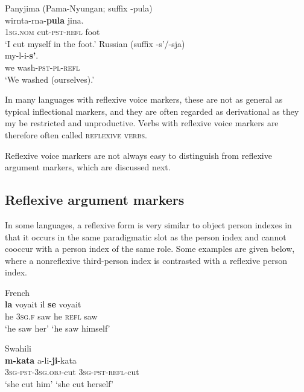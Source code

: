 \documentclass[output=paper]{langscibook}
\begin{document}
\ea  \label{ex:Haspelmath:17}
    \ea Panyjima (Pama-Nyungan; suffix -{pula}) \label{ex:Haspelmath:17a}\\
      {wirnta-rna-}\textbf{{pula}}  {jina.}\\
     \textsc{1sg.nom}  cut-\textsc{pst-refl}  foot \\
    \glt ‘I cut myself in the foot.’ \citep[160]{Dench1991}
    \ex Russian (suffix {{}-s’/-sja}) \label{ex:Haspelmath:17b}\\
      {my-l-i-}\textbf{{s’}}.\\
      we  wash-\textsc{pst-pl-refl}\\
      \glt ‘We washed (ourselves).’
    \z
\z   

    

In many languages with reflexive voice markers, these are not as general as typical inflectional markers, and they are often regarded as derivational as they my be restricted and unproductive. Verbs with reflexive voice markers are therefore often called \textsc{reflexive} \textsc{verbs}.

Reflexive voice markers are not always easy to distinguish from reflexive argument markers, which are discussed next.


\subsection{Reflexive argument markers}\label{sec:Haspelmath:5.3}

In some languages, a reflexive form is very similar to object person indexes in that it occurs in the same paradigmatic slot as the person index and cannot cooccur with a person index of the same role. Some examples are given below, where a nonreflexive third-person index is contrasted with a reflexive person index.

\ea French 
    \label{ex:Haspelmath:18}\\
      \textbf{{la}}  {voyait}      {il}  \textbf{{se}}  {voyait}\\
      he  \textsc{3sg.f}  saw        he  \textsc{refl}  saw   \\
    \glt‘he saw her’        ‘he saw himself’
\z


\ea Swahili 
    \label{ex:Haspelmath:19}\\
    \textbf{{m}-kata}        {a-li-}\textbf{{ji}}{{}-kata}\\
       \textsc{3sg-pst-3sg.obj}{}-cut    \textsc{3sg-pst-refl}{}-cut  \\
    \glt    ‘she cut him’        ‘she cut herself’
\z
\end{document}
